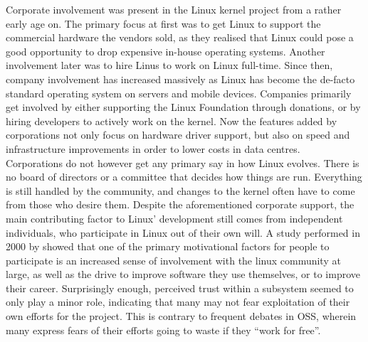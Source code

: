 Corporate involvement was present in the Linux kernel project from a rather early age on\cite{linus-biography}. The primary focus at first was to get Linux to support the commercial hardware the vendors sold, as they realised that Linux could pose a good opportunity to drop expensive in-house operating systems. Another involvement later was to hire Linus to work on Linux full-time. Since then, company involvement has increased massively as Linux has become the de-facto standard operating system on servers\cite{linux-server} and mobile devices\cite{linux-usage}. Companies primarily get involved by either supporting the Linux Foundation through donations\cite{linux-foundation}, or by hiring developers to actively work on the kernel\cite{linux-whowrites}. Now the features added by corporations not only focus on hardware driver support, but also on speed and infrastructure improvements in order to lower costs in data centres\cite{linux-bbr}. \\

Corporations do not however get any primary say in how Linux evolves. There is no board of directors or a committee that decides how things are run. Everything is still handled by the community, and changes to the kernel often have to come from those who desire them. Despite the aforementioned corporate support, the main contributing factor to Linux' development still comes from independent individuals, who participate in Linux out of their own will. A study performed in 2000 by \citet{linux-motivation} showed that one of the primary motivational factors for people to participate is an increased sense of involvement with the linux community at large, as well as the drive to improve software they use themselves, or to improve their career. Surprisingly enough, perceived trust within a subsystem seemed to only play a minor role, indicating that many may not fear exploitation of their own efforts for the project. This is contrary to frequent debates in OSS, wherein many express fears of their efforts going to waste if they ``work for free''. \\





